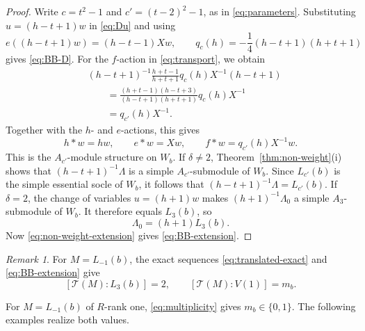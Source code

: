 \documentclass[11pt,reqno]{amsart}
\numberwithin{equation}{section}
\newcommand{\T}{\mathcal T}
\theoremstyle{definition}
\theoremstyle{remark}
\newtheorem{remark}[theorem]{Remark}
\begin{document}
\begin{proof}
Write \(c=t^2-1\) and \(c'=(t-2)^2-1\), as in \eqref{eq:parameters}.
Substituting \(u=(h-t+1)w\) in \eqref{eq:Du} and using
\[
e((h-t+1)w)=(h-t-1)Xw,\qquad
q_c(h)=-\frac{1}{4}(h-t+1)(h+t+1)
\]
gives \eqref{eq:BB-D}. For the \(f\)-action in
\eqref{eq:transport}, we obtain
\[
\begin{aligned}
&(h-t+1)^{-1}\frac{h+t-1}{h+t+1}q_c(h)X^{-1}(h-t+1)\\
&\qquad=\frac{(h+t-1)(h-t+3)}{(h-t+1)(h+t+1)}q_c(h)X^{-1}\\
&\qquad=q_{c'}(h)X^{-1}.
\end{aligned}
\]
Together with the \(h\)- and \(e\)-actions, this gives
\begin{equation}\label{eq:BB-action}
h*w=hw,\qquad e*w=Xw,\qquad f*w=q_{c'}(h)X^{-1}w.
\end{equation}
This is the \(A_{c'}\)-module structure on \(W_b\).
If \(\delta\ne2\), Theorem~\ref{thm:non-weight}(i) shows that
\((h-t+1)^{-1}\Lambda\) is a simple \(A_{c'}\)-submodule of \(W_b\).
Since \(L_{c'}(b)\) is the simple essential socle of \(W_b\),
it follows that \((h-t+1)^{-1}\Lambda=L_{c'}(b)\).
If \(\delta=2\), the change of variables \(u=(h+1)w\)
makes \((h+1)^{-1}\Lambda_0\) a simple \(A_3\)-submodule
of \(W_b\). It therefore equals \(L_3(b)\), so
\begin{equation}\label{eq:socle-coordinates}
\Lambda_0=(h+1)L_3(b).
\end{equation}
Now \eqref{eq:non-weight-extension} gives \eqref{eq:BB-extension}.
\end{proof}

\begin{remark}
For \(M=L_{-1}(b)\), the exact sequences
\eqref{eq:translated-exact} and \eqref{eq:BB-extension} give
\[
[\T(M):L_3(b)]=2,\qquad [\T(M):V(1)]=m_b.
\]
\end{remark}

For \(M=L_{-1}(b)\) of \(R\)-rank one, \eqref{eq:multiplicity} gives
\(m_b\in\{0,1\}\). The following examples realize both values.
\end{document}
